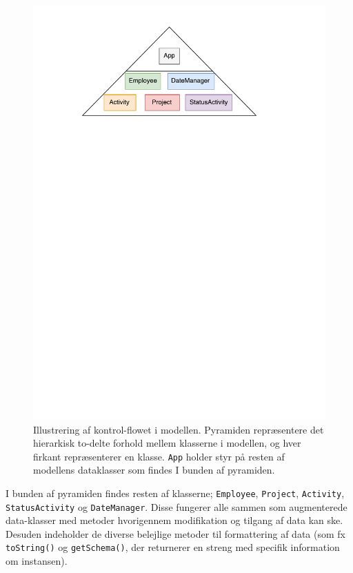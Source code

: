 \begin{figure}[H]
    \centering
    \includegraphics[scale = 0.8]{Figurer/totrin.pdf}
    \caption{Illustrering af kontrol-flowet i modellen. Pyramiden repræsentere det hierarkisk to-delte forhold mellem klasserne i modellen, og hver firkant repræsenterer en klasse. \texttt{App} holder styr på resten af modellens dataklasser som findes I bunden af pyramiden.}
    \label{fig:totrin}
\end{figure}
I bunden af pyramiden findes resten af klasserne; \texttt{Employee}, \texttt{Project}, \texttt{Activity}, \texttt{StatusActivity} og \texttt{DateManager}. Disse fungerer alle sammen som augmenterede data-klasser med metoder hvorigennem modifikation og tilgang af data kan ske. Desuden indeholder de diverse belejlige metoder til formattering af data (som fx \texttt{toString()} og \texttt{getSchema()}, der returnerer en streng med specifik information om instansen). 


